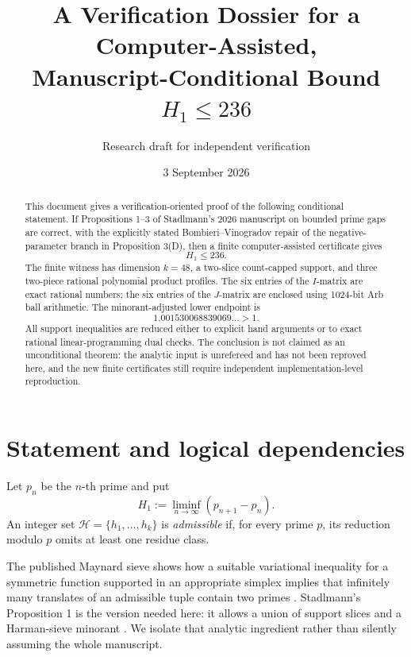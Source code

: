 \documentclass[11pt]{article}
\title{A Verification Dossier for a Computer-Assisted,\\
Manuscript-Conditional Bound \(H_1\leq 236\)}
\author{Research draft for independent verification}
\date{3 September 2026}
\theoremstyle{definition}
\theoremstyle{remark}
\newcommand{\Hone}{H_1}
\begin{document}
\maketitle

\begin{abstract}
This document gives a verification-oriented proof of the following conditional
statement.  If Propositions 1--3 of Stadlmann's 2026 manuscript on bounded
prime gaps are correct, with the explicitly stated Bombieri--Vinogradov repair
of the negative-parameter branch in Proposition 3(D), then a finite
computer-assisted certificate gives
\[
  \Hone\leq 236.
\]
The finite witness has dimension \(k=48\), a two-slice count-capped support,
and three two-piece rational polynomial product profiles.  The six entries of
the \(I\)-matrix are exact rational numbers; the six entries of the
\(J\)-matrix are enclosed using 1024-bit Arb ball arithmetic.  The
minorant-adjusted lower endpoint is
\[
  1.001530068839069\ldots>1.
\]
All support inequalities are reduced either to explicit hand arguments or to
exact rational linear-programming dual checks.  The conclusion is not claimed
as an unconditional theorem: the analytic input is unrefereed and has not
been reproved here, and the new finite certificates still require independent
implementation-level reproduction.
\end{abstract}

\begin{center}
\end{center}

\tableofcontents

\section{Statement and logical dependencies}

Let \(p_n\) be the \(n\)-th prime and put
\[
  H_1:=\liminf_{n\to\infty}(p_{n+1}-p_n).
\]
An integer set \(\mathcal H=\{h_1,\ldots,h_k\}\) is \emph{admissible} if,
for every prime \(p\), its reduction modulo \(p\) omits at least one residue
class.

The published Maynard sieve shows how a suitable variational inequality for a
symmetric function supported in an appropriate simplex implies that infinitely
many translates of an admissible tuple contain two primes
\cite{Maynard2015}.  Stadlmann's Proposition 1 is the version needed here: it
allows a union of support slices and a Harman-sieve minorant
\cite{Stadlmann2026}.  We isolate that analytic ingredient rather than silently
assuming the whole manuscript.
\end{document}
